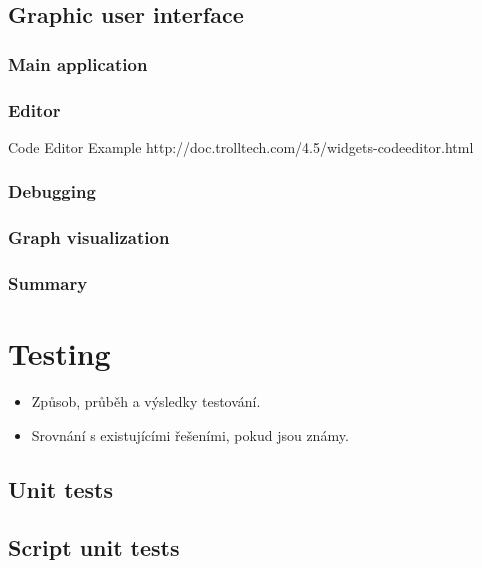 \documentclass[11pt,twoside,a4paper]{book}
\begin{document}
\section{Graphic user interface}

\subsection{Main application}

\subsection{Editor}

Code Editor Example
http://doc.trolltech.com/4.5/widgets-codeeditor.html

\subsection{Debugging}

\subsection{Graph visualization}

\subsection{Summary}




\chapter{Testing}

\begin{itemize}
 \item Způsob, průběh a výsledky testování.
 \item Srovnání s existujícími řešeními, pokud jsou známy.
\end{itemize}

\section{Unit tests}

\section{Script unit tests}
\end{document}

